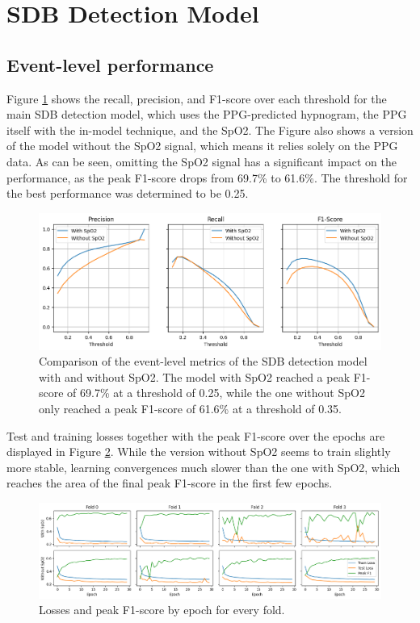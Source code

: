 \section{SDB Detection Model}

\subsection*{Event-level performance}

Figure \ref{fig:event-metrics} shows the recall, precision, and F1-score over each threshold for the main SDB detection model, which uses the PPG-predicted hypnogram, the PPG itself with the in-model technique, and the SpO2. The Figure also shows a version of the model without the SpO2 signal, which means it relies solely on the PPG data. As can be seen, omitting the SpO2 signal has a significant impact on the performance, as the peak F1-score drops from 69.7\% to 61.6\%. The threshold for the best performance was determined to be 0.25.

\begin{figure}
    \centering
    \includegraphics[width=\textwidth]{images/DetectionModelEventMetrics}
    \caption{Comparison of the event-level metrics of the SDB detection model with and without SpO2. The model with SpO2 reached a peak F1-score of 69.7\% at a threshold of 0.25, while the one without SpO2 only reached a peak F1-score of 61.6\% at a threshold of 0.35.}
    \label{fig:event-metrics}
\end{figure}

Test and training losses together with the peak F1-score over the epochs are displayed in Figure \ref{fig:event-epoch-losses}. While the version without SpO2 seems to train slightly more stable, learning convergences much slower than the one with SpO2, which reaches the area of the final peak F1-score in the first few epochs.

\begin{figure}
    \centering
    \includegraphics[width=\textwidth]{images/DetectionModelEpochLosses}
    \caption{Losses and peak F1-score by epoch for every fold.}
    \label{fig:event-epoch-losses}
\end{figure}

